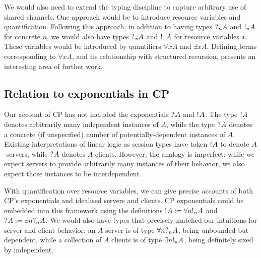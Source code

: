 \documentclass[a4paper,UKenglish]{lipics-v2016}
\begin{document}
We would also need to extend the typing discipline to capture arbitrary use of
shared channels.  One approach would be to introduce resource variables and
quantification.  Following this approach, in addition to having types $\give[n]
A$ and $\take[n] A$ for concrete $n$, we would also have types $\give[x] A$ and
$\take[x] A$ for resource variables $x$.  These variables would be introduced by
quantifiers $\forall x A$ and $\exists x A$.  Defining terms
corresponding to $\forall x A$, and its relationship with structured recursion,
presents an interesting area of further work.


\subsection*{Relation to exponentials in CP}
Our account of CP has not included the exponentials $\give A$ and $\take A$.
The type $\take A$ denotes arbitrarily many independent instances of $A$, while
the type $\give A$ denotes a concrete (if unspecified) number of
potentially-dependent instances of $A$.  Existing interpretations of linear
logic as session types have taken $\take A$ to denote $A$-servers, while
$\give A$ denotes $A$-clients.  However, the analogy is imperfect: while we
expect servers to provide arbitrarily many instances of their behavior, we also
expect those instances to be interdependent.

With quantification over resource variables, we can give precise accounts
of both CP's exponentials and idealised servers and clients.  CP
exponentials could be embedded into this framework using the definitions
$\take{A} := \forall{n}\take[n]{A}$ and $\give{A} := \exists{n}{\give[n]{A}}$.
We would also have types that precisely matched our intuitions for server and
client behavior: an $A$ server is of type $\forall n \give[n] A$, being
unbounded but dependent, while a collection of $A$ clients is of type
$\exists n \take[n] A$, being definitely sized by independent.

\clearpage

\end{document}
